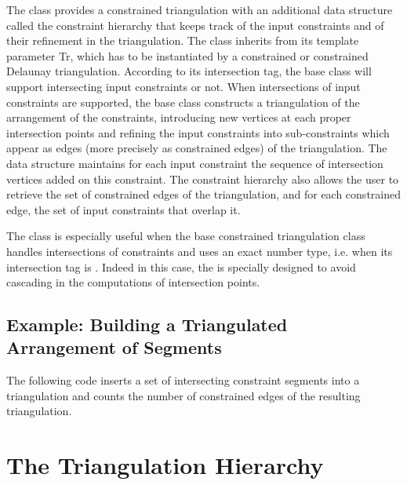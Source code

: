 The class 
provides a constrained triangulation with an additional data
structure called the  constraint hierarchy 
that keeps track of  the input constraints and of their refinement
in the triangulation.
The class 
inherits from its template parameter Tr, which has to be instantiated
by a constrained  or constrained Delaunay  triangulation.
According to its intersection tag, the base class
will support intersecting input constraints or not.
When intersections of input constraints are supported,
the base class constructs a triangulation  of the  arrangement
of the constraints,
introducing new vertices at each proper intersection
points and  refining the input constraints into sub-constraints
which appear as  edges (more precisely as constrained edges) of the
triangulation.  The  data structure maintains for each 
input constraint
the sequence of intersection vertices added on this constraint.
The constraint hierarchy also allows the user to retrieve the set
of constrained edges of the triangulation, and for each
constrained edge,  the set of input constraints that overlap it.

The class 
is especially useful when the base constrained triangulation class
handles intersections of constraints and uses an exact number type,
i.e. when its intersection tag is .
Indeed in this case, the 
is specially designed to avoid cascading in the computations of
intersection  points.

\subsection{Example: Building a Triangulated Arrangement of Segments}

The following code inserts a set of intersecting constraint segments
into a triangulation 
and counts the number of constrained edges of the
resulting triangulation.






\section{The Triangulation Hierarchy\label{Section_2D_Triangulations_Hierarchy}}


